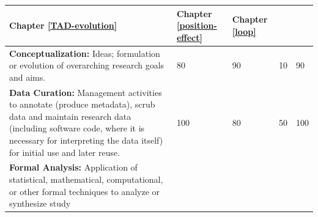 \documentclass[a4paper,twoside=true,openright,parskip=full,chapterprefix=true,11pt,headings=normal,bibliography=totoc,listof=totoc,titlepage=on,captions=tableabove,draft=false]{scrreprt}
\theoremstyle{definition}
\theoremstyle{definition}
\theoremstyle{definition}
\theoremstyle{remark}
\begin{document}
\begin{longtable}[]{@{}lllll@{}}
\begin{minipage}[b]{0.09\columnwidth}
Chapter \ref{TAD-evolution}\strut
\end{minipage} & \begin{minipage}[b]{0.10\columnwidth}\raggedright
Chapter \ref{position-effect}\strut
\end{minipage} & \begin{minipage}[b]{0.07\columnwidth}\raggedright
Chapter \ref{loop}\strut
\end{minipage}\tabularnewline
\midrule
\endhead
\begin{minipage}[t]{0.49\columnwidth}\raggedright
\textbf{Conceptualization:} Ideas; formulation or evolution of
overarching research goals and aims.\strut
\end{minipage} & \begin{minipage}[t]{0.11\columnwidth}\raggedright
80\strut
\end{minipage} & \begin{minipage}[t]{0.09\columnwidth}\raggedright
90\strut
\end{minipage} & \begin{minipage}[t]{0.10\columnwidth}\raggedright
10\strut
\end{minipage} & \begin{minipage}[t]{0.07\columnwidth}\raggedright
90\strut
\end{minipage}\tabularnewline
\begin{minipage}[t]{0.49\columnwidth}\raggedright
\textbf{Data Curation:} Management activities to annotate (produce
metadata), scrub data and maintain research data (including software
code, where it is necessary for interpreting the data itself) for
initial use and later reuse.\strut
\end{minipage} & \begin{minipage}[t]{0.11\columnwidth}\raggedright
100\strut
\end{minipage} & \begin{minipage}[t]{0.09\columnwidth}\raggedright
80\strut
\end{minipage} & \begin{minipage}[t]{0.10\columnwidth}\raggedright
50\strut
\end{minipage} & \begin{minipage}[t]{0.07\columnwidth}\raggedright
100\strut
\end{minipage}\tabularnewline
\begin{minipage}[t]{0.49\columnwidth}\raggedright
\textbf{Formal Analysis:} Application of statistical, mathematical,
computational, or other formal techniques to analyze or synthesize study

\end{minipage}
\end{longtable}
\end{document}
